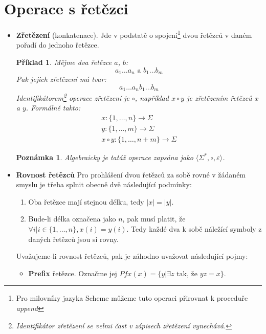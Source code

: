 \documentclass[10pt, a4paper, titlepage]{article}
\theoremstyle{note}
\newtheorem{priklad}{\textbf{Příklad}}
\newtheorem{poznamka}{\textbf{Poznámka}}
\begin{document}
\section{Operace s řetězci}
\begin{itemize}
\item
\textbf{Zřetězení} (konkatenace). Jde v podstatě o spojení\footnote{Pro milovníky jazyka Scheme můžeme tuto operaci přirovnat k proceduře \emph{append}}
dvou řetězců v daném pořadí do jednoho řetězce.

\begin{priklad}
Mějme dva řetězce $a$, $b$:
$$
a_{1}\ldots a_{n} \text{ a } b_{1}\ldots b_{m}
$$
Pak jejich zřetězení má tvar:
$$
a_{1}\ldots a_{n}b_{1}\ldots b_{m}
$$
Identifikátorem\footnote{Identifikátor zřetězení se velmi čast v zápisech zřetězení vynechává.} operace
zřetězení je $\circ$, například $x\circ y$ je zřetězením řetězců $x$ a $y$.
Formálně takto:
\begin{gather*}
x : \lbrace 1,\ldots, n \rbrace \rightarrow \Sigma \\
y : \lbrace 1,\ldots, m \rbrace \rightarrow \Sigma \\
x \circ y : \lbrace 1,\ldots, n+m \rbrace \rightarrow \Sigma
\end{gather*}
\end{priklad}

\begin{poznamka}
Algebraicky je tatáž operace zapsána jako $\langle \Sigma^{*}, \circ, \varepsilon \rangle$.
\end{poznamka}

\item
\textbf{Rovnost řetězců}
Pro prohlášení dvou řetězců za sobě rovné v žádaném smyslu je třeba splnit obecně dvě následující podmínky:
\begin{enumerate}
\item
Oba řetězce mají stejnou délku, tedy $|x| = |y|$.

\item
Bude-li délka označena jako $n$, pak musí platit, že $\forall i | i \in \lbrace 1, \ldots, n \rbrace, x(i) = y(i)$.
Tedy každé dva k sobě náležící symboly z daných řetězců jsou si rovny.
\end{enumerate}
Uvažujeme-li rovnost řetězců, pak je záhodno uvažovat následující pojmy:
\begin{itemize}
\item
\textbf{Prefix} řetězce. Označme jej $Pfx(x) = \lbrace y | \exists z \text{ tak, že } yz = x \rbrace$.


\end{itemize}
\end{itemize}
\end{document}
